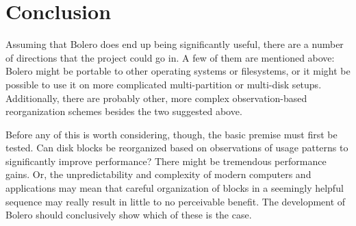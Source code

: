 \documentclass[10pt]{article}
\begin{document}
\section{Conclusion}

Assuming that Bolero does end up being significantly useful, there are a number of directions that
the project could go in. A few of them are mentioned above: Bolero might be portable to other
operating systems or filesystems, or it might be possible to use it on more complicated multi-partition
or multi-disk setups. Additionally, there are probably other, more complex observation-based reorganization schemes
besides the two suggested above.

Before any of this is worth considering, though, the basic premise must first be tested. Can disk
blocks be reorganized based on observations of usage patterns to significantly improve performance?
There might be tremendous performance gains. Or, the unpredictability and complexity of modern
computers and applications may mean that careful organization of blocks in a seemingly helpful
sequence may really result in little to no perceivable benefit. The development of Bolero should conclusively
show which of these is the case.

{}

\end{document}
